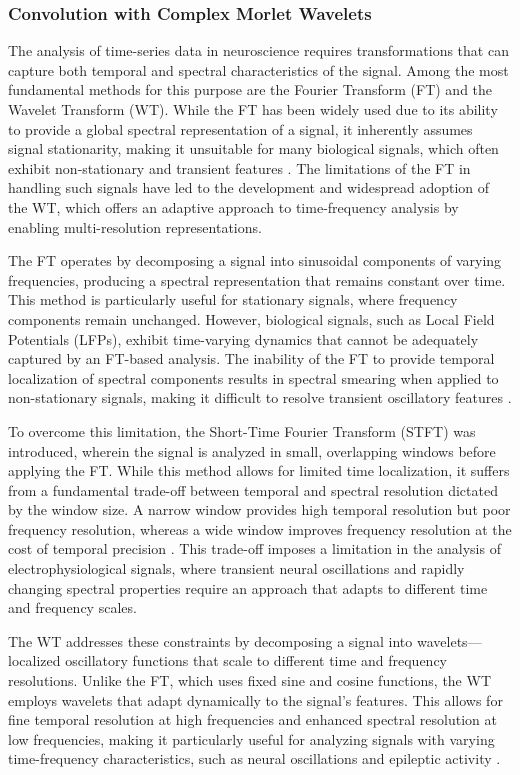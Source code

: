 \documentclass{article}
\begin{document}
\subsubsection{Convolution with Complex Morlet Wavelets}

The analysis of time-series data in neuroscience requires transformations that can capture both temporal and spectral characteristics of the signal. Among the most fundamental methods for this purpose are the Fourier Transform (FT) and the Wavelet Transform (WT). While the FT has been widely used due to its ability to provide a global spectral representation of a signal, it inherently assumes signal stationarity, making it unsuitable for many biological signals, which often exhibit non-stationary and transient features \cite{bruns2004}. The limitations of the FT in handling such signals have led to the development and widespread adoption of the WT, which offers an adaptive approach to time-frequency analysis by enabling multi-resolution representations.

The FT operates by decomposing a signal into sinusoidal components of varying frequencies, producing a spectral representation that remains constant over time. This method is particularly useful for stationary signals, where frequency components remain unchanged. However, biological signals, such as Local Field Potentials (LFPs), exhibit time-varying dynamics that cannot be adequately captured by an FT-based analysis. The inability of the FT to provide temporal localization of spectral components results in spectral smearing when applied to non-stationary signals, making it difficult to resolve transient oscillatory features \cite{cohen2014}.

To overcome this limitation, the Short-Time Fourier Transform (STFT) was introduced, wherein the signal is analyzed in small, overlapping windows before applying the FT. While this method allows for limited time localization, it suffers from a fundamental trade-off between temporal and spectral resolution dictated by the window size. A narrow window provides high temporal resolution but poor frequency resolution, whereas a wide window improves frequency resolution at the cost of temporal precision \cite{cohen2019}. This trade-off imposes a limitation in the analysis of electrophysiological signals, where transient neural oscillations and rapidly changing spectral properties require an approach that adapts to different time and frequency scales.

The WT addresses these constraints by decomposing a signal into wavelets—localized oscillatory functions that scale to different time and frequency resolutions. Unlike the FT, which uses fixed sine and cosine functions, the WT employs wavelets that adapt dynamically to the signal’s features. This allows for fine temporal resolution at high frequencies and enhanced spectral resolution at low frequencies, making it particularly useful for analyzing signals with varying time-frequency characteristics, such as neural oscillations and epileptic activity \cite{daubechies1992}.
\end{document}
